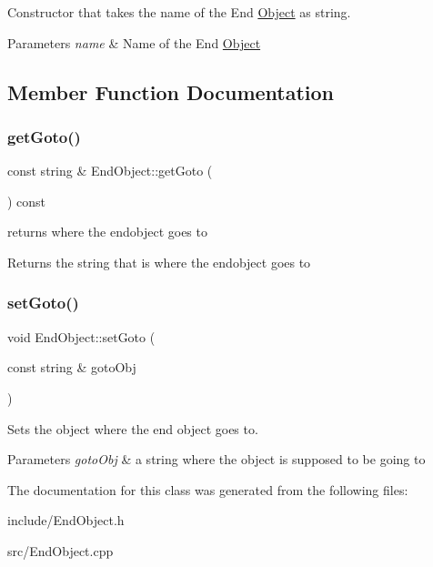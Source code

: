 Constructor that takes the name of the End \hyperlink{classObject}{Object} as string. 


\begin{DoxyParams}{Parameters}
{\em name} & Name of the End \hyperlink{classObject}{Object} \\
\hline
\end{DoxyParams}


\subsection{Member Function Documentation}
\mbox{\label{classEndObject_a24ff73b898d1fa9fa15b98f490bf6bbc}} 
\subsubsection{\texorpdfstring{get\+Goto()}{getGoto()}}
{\footnotesize\ttfamily const string \& End\+Object\+::get\+Goto (\begin{DoxyParamCaption}{ }\end{DoxyParamCaption}) const}



returns where the endobject goes to 

\begin{DoxyReturn}{Returns}
the string that is where the endobject goes to 
\end{DoxyReturn}
\mbox{\label{classEndObject_af2fd8ca8246a6891f72f44aacd55cba4}} 
\subsubsection{\texorpdfstring{set\+Goto()}{setGoto()}}
{\footnotesize\ttfamily void End\+Object\+::set\+Goto (\begin{DoxyParamCaption}\item[{const string \&}]{goto\+Obj }\end{DoxyParamCaption})}



Sets the object where the end object goes to. 


\begin{DoxyParams}{Parameters}
{\em goto\+Obj} & a string where the object is supposed to be going to \\
\hline
\end{DoxyParams}


The documentation for this class was generated from the following files\+:\begin{DoxyCompactItemize}
\item 
include/End\+Object.\+h\item 
src/End\+Object.\+cpp\end{DoxyCompactItemize}
